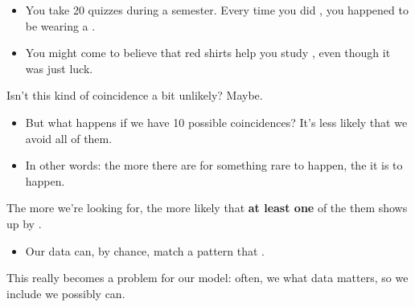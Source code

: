         \begin{itemize}
            \item \miniex You take 20 quizzes during a semester. Every time you did , you happened to be wearing a .
            
            \item You might come to believe that red shirts help you study , even though it was just luck.
        \end{itemize}

        Isn't this kind of coincidence a bit unlikely? Maybe. 

        \begin{itemize}
            \item But what happens if we have 10 possible coincidences? It's less likely that we avoid all of them.

            \item In other words: the more  there are for something rare to happen, the  it is to happen.\\
        \end{itemize}


        \begin{concept}
            The more  we're looking for, the more likely that \textbf{at least one} of the them shows up by .

            \begin{itemize}
                \item Our data can, by chance, match a pattern that . 
            \end{itemize}
        \end{concept}
        

        This really becomes a problem for our model: often, we  what data matters, so we include  we possibly can.

